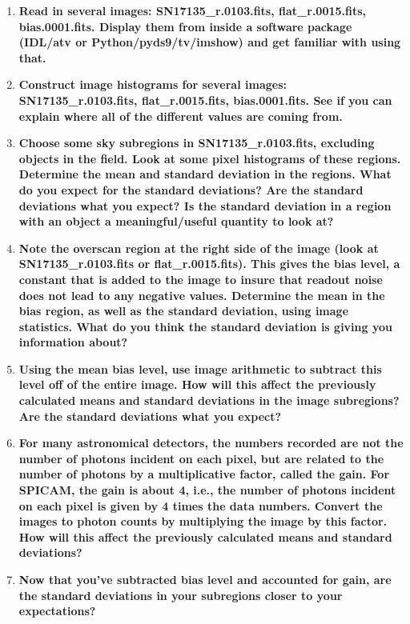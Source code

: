 \documentclass[12pt]{article}
\begin{document}
\begin{enumerate}[1.]
    \item \textbf{Read in several images: SN17135\_r.0103.fits,
    flat\_r.0015.fits, bias.0001.fits. Display them from inside a
    software package (IDL/atv or Python/pyds9/tv/imshow) and get
    familiar with using that.} 
    \item \textbf{Construct image histograms for several images:
    SN17135\_r.0103.fits, flat\_r.0015.fits, bias.0001.fits. See if you
    can explain where all of the different values are coming from.}
    \item \textbf{Choose some sky subregions in SN17135\_r.0103.fits,
    excluding objects in the field. Look at some pixel histograms of
    these regions. Determine the mean and standard deviation in the
    regions. What do you expect for the standard deviations? Are the
    standard deviations what you expect? Is the standard deviation in
    a region with an object a meaningful/useful quantity to look at?}
    \item \textbf{Note the overscan region at the right side of the
    image (look at SN17135\_r.0103.fits or flat\_r.0015.fits). This
    gives the bias level, a constant that is added to the image to
    insure that readout noise does not lead to any negative values.
    Determine the mean in the bias region, as well as the standard
    deviation, using image statistics. What do you think the standard
    deviation is giving you information about?}
    \item \textbf{Using the mean bias level, use image arithmetic to
    subtract this level off of the entire image. How will this affect
    the previously calculated means and standard deviations in the
    image subregions? Are the standard deviations what you expect?}
    \item \textbf{For many astronomical detectors, the numbers
    recorded are not the number of photons incident on each pixel, but
    are related to the number of photons by a multiplicative factor,
    called the gain. For SPICAM, the gain is about 4, i.e., the number
    of photons incident on each pixel is given by 4 times the data
    numbers. Convert the images to photon counts by multiplying the
    image by this factor. How will this affect the previously
    calculated means and standard deviations?}
    \item \textbf{Now that you've subtracted bias level and accounted
    for gain, are the standard deviations in your subregions closer to
    your expectations?}

\end{enumerate}
\end{document}
